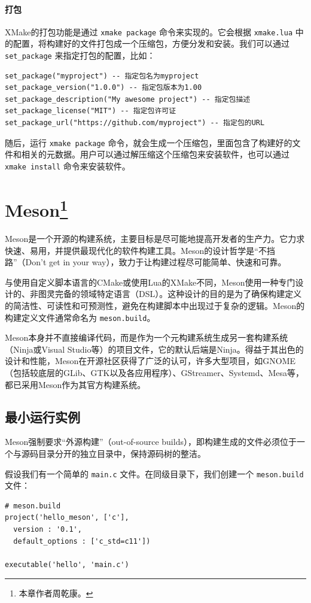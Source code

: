 \paragraph{打包} XMake的打包功能是通过 \verb|xmake package| 命令来实现的。它会根据 \verb|xmake.lua| 中的配置，将构建好的文件打包成一个压缩包，方便分发和安装。我们可以通过 \verb|set_package| 来指定打包的配置，比如：
\begin{verbatim}
set_package("myproject") -- 指定包名为myproject
set_package_version("1.0.0") -- 指定包版本为1.00
set_package_description("My awesome project") -- 指定包描述
set_package_license("MIT") -- 指定包许可证
set_package_url("https://github.com/myproject") -- 指定包的URL
\end{verbatim}

随后，运行 \verb|xmake package| 命令，就会生成一个压缩包，里面包含了构建好的文件和相关的元数据。用户可以通过解压缩这个压缩包来安装软件，也可以通过 \verb|xmake install| 命令来安装软件。

\section[Meson]{Meson\protect\footnote{本章作者周乾康。}}

Meson是一个开源的构建系统，主要目标是尽可能地提高开发者的生产力。它力求快速、易用，并提供最现代化的软件构建工具。Meson的设计哲学是“不挡路”（Don't get in your way），致力于让构建过程尽可能简单、快速和可靠。

与使用自定义脚本语言的CMake或使用Lua的XMake不同，Meson使用一种专门设计的、非图灵完备的领域特定语言（DSL）。这种设计的目的是为了确保构建定义的简洁性、可读性和可预测性，避免在构建脚本中出现过于复杂的逻辑。Meson的构建定义文件通常命名为 \verb|meson.build|。

Meson本身并不直接编译代码，而是作为一个元构建系统生成另一套构建系统（Ninja或Visual Studio等）的项目文件，它的默认后端是Ninja。得益于其出色的设计和性能，Meson在开源社区获得了广泛的认可，许多大型项目，如GNOME（包括较底层的GLib、GTK以及各应用程序）、GStreamer、Systemd、Mesa等，都已采用Meson作为其官方构建系统。

\subsection{最小运行实例}
Meson强制要求“外源构建”（out-of-source builds），即构建生成的文件必须位于一个与源码目录分开的独立目录中，保持源码树的整洁。

假设我们有一个简单的 \verb|main.c| 文件。在同级目录下，我们创建一个 \verb|meson.build| 文件：
\begin{verbatim}
# meson.build
project('hello_meson', ['c'],
  version : '0.1',
  default_options : ['c_std=c11'])

executable('hello', 'main.c')
\end{verbatim}

